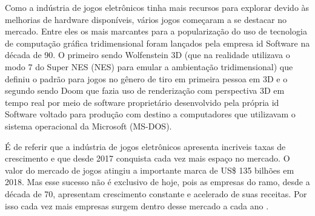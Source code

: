 Como a indústria de jogos eletrônicos tinha mais recursos para explorar devido às melhorias de hardware disponíveis, vários jogos começaram a se destacar no mercado. Entre eles os mais marcantes para a popularização do uso de tecnologia de computação gráfica tridimensional foram lançados pela empresa id Software na década de 90. O primeiro sendo Wolfenstein 3D (que na realidade utilizava o modo 7 do Super NES (\acrlong{NES}) para emular a ambientação tridimensional) que definiu o padrão para jogos no gênero de tiro em primeira pessoa em 3D e o segundo sendo Doom que fazia uso de renderização com perspectiva 3D em tempo real por meio de software proprietário desenvolvido pela própria id Software voltado para produção com destino a computadores que utilizavam o sistema operacional da Microsoft (\acrshort{MS-DOS}).

    \begin{figure}[h!]
		\centering
	\end{figure}
	\nocite{figura3}

É de referir que a indústria de jogos eletrônicos apresenta incriveis taxas de crescimento e que desde 2017 conquista cada vez mais espaço no mercado. O valor do mercado de jogos atingiu a importante marca de US\$ 135 bilhões em 2018. Mas esse sucesso não é exclusivo de hoje, pois as empresas do ramo, desde a década de 70, apresentam crescimento constante e acelerado de suas receitas. Por isso cada vez mais empresas surgem dentro desse mercado a cada ano \cite{comparacaoDesempenho2}. 
	
